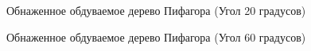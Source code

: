 \documentclass[a4paper,12pt]{article}
\begin{document}
	\begin{figure}[h!]
		\caption{
			Обнаженное обдуваемое дерево Пифагора (Угол 20 градусов)}
		\label{fig:t2}
	\end{figure}
	
\newpage
	
	\begin{figure}[h!]
		\caption{
			Обнаженное обдуваемое дерево Пифагора (Угол 60 градусов)}
		\label{fig:t3}
	\end{figure}
	
\end{document}
